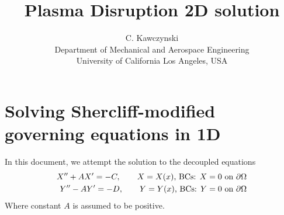 \documentclass[11pt]{article}
\begin{document}
\doublespacing
\title{Plasma Disruption 2D solution}
\author{C. Kawczynski \\
Department of Mechanical and Aerospace Engineering \\
University of California Los Angeles, USA\\
}
\maketitle

\section{Solving Shercliff-modified governing equations in 1D}
In this document, we attempt the solution to the decoupled equations
\begin{equation}\begin{aligned}
X'' + A X' = - C, \qquad X=X(x) \text{, BCs: $X = 0 $ on $\partial \Omega$} \\
Y'' - A Y' = - D, \qquad Y=Y(x) \text{, BCs: $Y = 0 $ on $\partial \Omega$} \\
\end{aligned} \end{equation}
Where constant $A$ is assumed to be positive.
\end{document}

